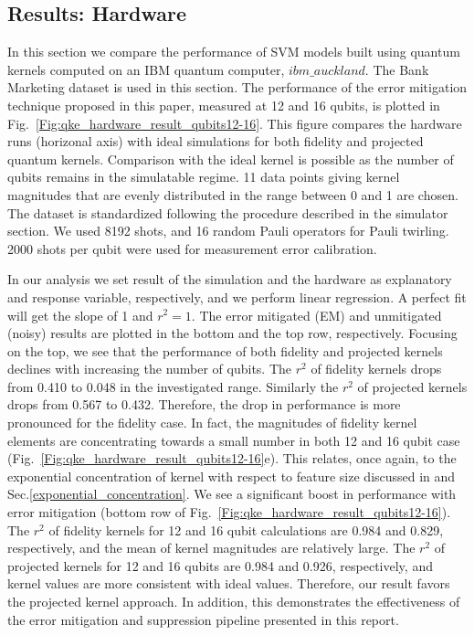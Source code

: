 \documentclass[reprint,amsfonts, amssymb, amsmath,  showkeys, nofootinbib,pra, superscriptaddress, twocolumn,longbibliography]{revtex4-2}
\begin{document}
\subsection{Results: Hardware}

In this section we compare the performance of SVM models built using quantum kernels computed on an IBM quantum computer, $ibm\_auckland$. The Bank Marketing dataset is used in this section.
The performance of the error mitigation technique proposed in this paper, measured at 12 and 16 qubits, is plotted in Fig.~\ref{Fig:qke_hardware_result_qubits12-16}. This figure compares the hardware runs (horizonal axis) with ideal simulations for both fidelity and projected quantum kernels. Comparison with the ideal kernel is possible as the number of qubits remains in the simulatable regime. 11 data points giving kernel magnitudes that are evenly distributed in the range between 0 and 1 are chosen. The dataset is standardized following the procedure described in the simulator section. We used 8192 shots, and 16 random Pauli operators for Pauli twirling. 2000 shots per qubit were used for measurement error calibration.

In our analysis we set result of the simulation and the hardware as explanatory and response variable, respectively, and we perform linear regression. A perfect fit will get the slope of 1 and $r^2=1$. 
The error mitigated (EM) and unmitigated (noisy) results are plotted in the bottom and the top row, respectively. Focusing on the top, we see that the performance of both fidelity and projected kernels declines with increasing the number of qubits. The $r^2$ of fidelity kernels drops from 0.410 to 0.048 in the investigated range. Similarly the $r^2$ of projected kernels drops from 0.567 to 0.432. Therefore, the drop in performance is more pronounced for the fidelity case. In fact, the magnitudes of fidelity kernel elements are concentrating towards a small number in both 12 and 16 qubit case (Fig.~\ref{Fig:qke_hardware_result_qubits12-16}e). 
This relates, once again, to the exponential concentration of kernel with respect to feature size discussed in \cite{thanasilp2022exponential} and Sec.\ref{exponential_concentration}.
We see a significant boost in performance with error mitigation (bottom row of Fig.~\ref{Fig:qke_hardware_result_qubits12-16}). The $r^2$ of fidelity kernels for 12 and 16 qubit calculations are 0.984 and 0.829, respectively, and the mean of kernel magnitudes are relatively large. The $r^2$ of projected kernels for 12 and 16 qubits are 0.984 and 0.926, respectively, and kernel values are more consistent with ideal values. Therefore, our result favors the projected kernel approach.
In addition, this demonstrates the effectiveness of the error mitigation and suppression pipeline presented in this report.
\end{document}
